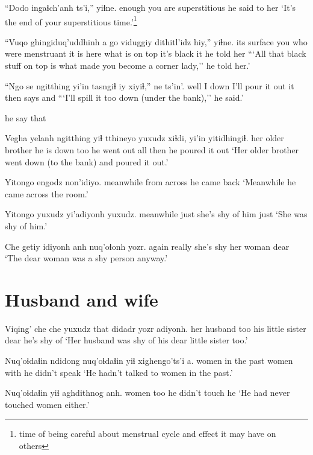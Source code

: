 \documentclass[12pt]{article}
\begin{document}
\gll ``Dodo   ingaɬch'anh          ts'i,'' yiɬne.
enough {you are superstitious} {} {he said to her}
\glt `It's the end of your superstitious time.'\footnote{time of being careful about menstrual cycle and effect it may have on others}
\glend

\gll ``Vuqo      ghingiduq'uddhinh       a   go   viduggiy dithitl'idz hiy,'' yiɬne.
{its surface} {you who were menstruant} {it is} here {what is on top}   {it's black}  it  {he told her}
\glt ```All that black stuff on top is what made you become a corner lady,'' he told her.'
\glend

\gll ``Ngo se ngitthing {yi'in tasngiɬ}    iy xiyiɬ,'' ne ts'in'. 
well I down      {I'll pour it out} it then {says} and
\glt ```I'll spill it too down (under the bank),'' he said.'
\glend

he say that

\gll Vegha             yelanh ngitthing yiɬ tthineyo yuxudz xiɬdi, {yi'in yitidhingiɬ.}
{her older brother} {he is}  down  too {he went out} all then {he poured it out}
\glt `Her older brother went down (to the bank) and poured it out.'
\glend

\gll Yitongo   engodz      non'idiyo.  
meanwhile {from across} {he came back} 
\glt `Meanwhile he came across the room.'
\glend

\gll Yitongo yuxudz yi'adiyonh        yuxudz.
meanwhile just {she's shy of him} just
\glt   `She was shy of him.'
\glend

\gll Che getiy idiyonh anh nuq'oɬonh yozr.
again really {she's shy} her woman dear
\glt `The dear woman was a shy person anyway.'
\glend

\section*{Husband and wife}

\gll Viqing'     che che yuxudz  that  didadr            yozr adiyonh.        
{her husband} too {} {}  {} {his little sister} dear {he's shy of}
\glt `Her husband was shy of his dear little sister too.'
\glend

\gll Nuq'oɬdaɬin ndidong   nuq'oɬdaɬin yiɬ  {xighengo'ts'i} a.
women       {in the past} women     with {he didn't speak}
\glt `He hadn't talked to women in the past.'
\glend

\gll Nuq'oɬdaɬin yiɬ {aghdithnog} anh.
women       too {he didn't touch} he
\glt `He had never touched women either.'
\glend
\end{document}
